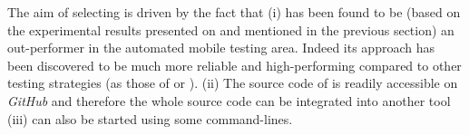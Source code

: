 The aim of selecting \sapienz is driven by the fact that (i) \sapienz has been found to be (based on the experimental results presented on \cite{sapienz} and mentioned in the previous section) an out-performer in the automated mobile testing area. Indeed its approach has been discovered to be much more reliable and high-performing compared to other testing strategies (as those of \monkey or \dynodroid). (ii) The source code of \sapienz is readily accessible on \textit{GitHub} and therefore the whole source code can be integrated into another tool (iii) \sapienz can also be started using some command-lines. 










